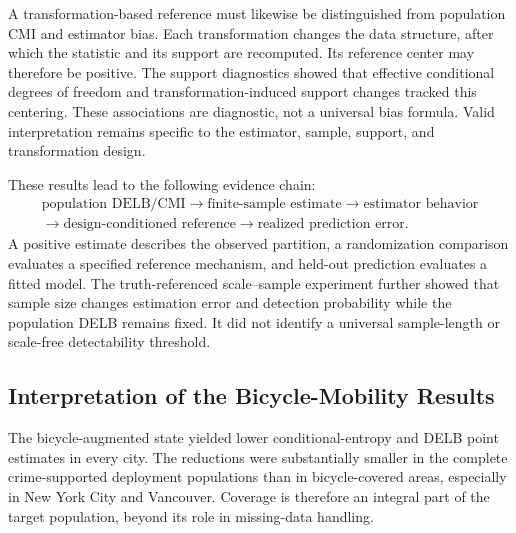 A transformation-based reference must likewise be distinguished from
population CMI and estimator bias. Each transformation changes the data
structure, after which the statistic and its support are recomputed. Its
reference center may therefore be positive. The support diagnostics showed
that effective conditional degrees of freedom and transformation-induced
support changes tracked this centering. These associations are diagnostic,
not a universal bias formula. Valid interpretation remains specific to the
estimator, sample, support, and transformation design.

These results lead to the following evidence chain:
\begin{equation}
\begin{gathered}
\text{population DELB/CMI}
\longrightarrow
\text{finite-sample estimate}
\longrightarrow
\text{estimator behavior}\\
\longrightarrow
\text{design-conditioned reference}
\longrightarrow
\text{realized prediction error}.
\end{gathered}
\label{eq:discussion_inference_chain}
\end{equation}
A positive estimate describes the observed partition, a randomization
comparison evaluates a specified reference mechanism, and held-out
prediction evaluates a fitted model. The truth-referenced scale--sample
experiment further showed that sample size changes estimation error and
detection probability while the population DELB remains fixed. It did not
identify a universal sample-length or scale-free detectability threshold.


\subsection{Interpretation of the Bicycle-Mobility Results}
\label{subsec:discussion_rq3}

The bicycle-augmented state yielded lower conditional-entropy and DELB point
estimates in every city. The reductions were substantially smaller in the
complete crime-supported deployment populations than in bicycle-covered
areas, especially in New York City and Vancouver. Coverage is therefore an
integral part of the target population, beyond its role in missing-data
handling.

